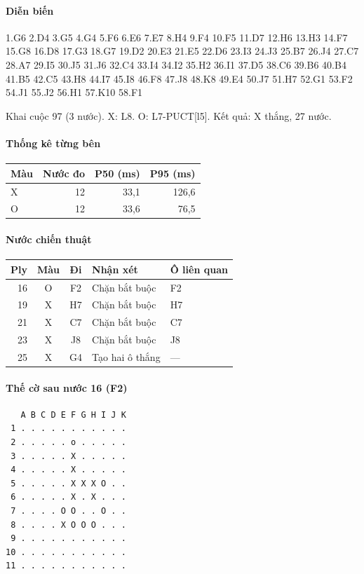 \paragraph{Diễn biến}
{\footnotesize 1.G6 2.D4 3.G5 4.G4 5.F6 6.E6 7.E7 8.H4 9.F4 10.F5 11.D7 12.H6 13.H3 14.F7 15.G8 16.D8 17.G3 18.G7 19.D2 20.E3 21.E5 22.D6 23.I3 24.J3 25.B7 26.J4 27.C7 28.A7 29.I5 30.J5 31.J6 32.C4 33.I4 34.I2 35.H2 36.I1 37.D5 38.C6 39.B6 40.B4 41.B5 42.C5 43.H8 44.I7 45.I8 46.F8 47.J8 48.K8 49.E4 50.J7 51.H7 52.G1 53.F2 54.J1 55.J2 56.H1 57.K10 58.F1\par}
Khai cuộc 97 (3 nước). X: L8. O: L7-PUCT[l5]. Kết quả: X thắng, 27 nước.
\paragraph{Thống kê từng bên}
\begin{center}\small
\begin{tabular}{@{}lrrr@{}}
\toprule
Màu & Nước đo & P50 (ms) & P95 (ms) \\
\midrule
X & 12 & 33,1 & 126,6 \\
O & 12 & 33,6 & 76,5 \\
\bottomrule
\end{tabular}
\end{center}
\paragraph{Nước chiến thuật}
\begin{center}\small
\begin{tabular}{@{}rccll@{}}
\toprule
Ply & Màu & Đi & Nhận xét & Ô liên quan \\
\midrule
16 & O & F2 & Chặn bắt buộc & F2 \\
19 & X & H7 & Chặn bắt buộc & H7 \\
21 & X & C7 & Chặn bắt buộc & C7 \\
23 & X & J8 & Chặn bắt buộc & J8 \\
25 & X & G4 & Tạo hai ô thắng & — \\
\bottomrule
\end{tabular}
\end{center}
\paragraph{Thế cờ sau nước 16 (F2)}
\begin{verbatim}
   A B C D E F G H I J K
 1 . . . . . . . . . . .
 2 . . . . . o . . . . .
 3 . . . . . X . . . . .
 4 . . . . . X . . . . .
 5 . . . . . X X X O . .
 6 . . . . . X . X . . .
 7 . . . . O O . . O . .
 8 . . . . X O O O . . .
 9 . . . . . . . . . . .
10 . . . . . . . . . . .
11 . . . . . . . . . . .
\end{verbatim}
